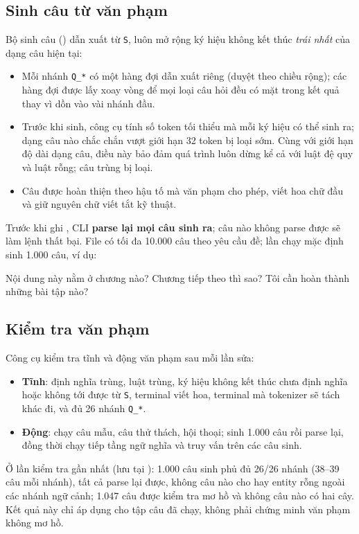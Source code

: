 \subsection{Sinh câu từ văn phạm}

Bộ sinh câu () dẫn xuất từ \texttt{S}, luôn mở rộng ký hiệu không kết
thúc \emph{trái nhất} của dạng câu hiện tại:
\begin{itemize}
  \item Mỗi nhánh \texttt{Q\_*} có một hàng đợi dẫn xuất riêng (duyệt theo chiều rộng);
        các hàng đợi được lấy xoay vòng để mọi loại câu hỏi đều có mặt trong kết quả
        thay vì dồn vào vài nhánh đầu.
  \item Trước khi sinh, công cụ tính số token tối thiểu mà mỗi ký hiệu có thể sinh ra;
        dạng câu nào chắc chắn vượt giới hạn 32 token bị loại sớm. Cùng với giới hạn độ
        dài dạng câu, điều này bảo đảm quá trình luôn dừng kể cả với luật đệ quy và luật
        rỗng; câu trùng bị loại.
  \item Câu được hoàn thiện theo hậu tố mà văn phạm cho phép, viết hoa chữ đầu và giữ
        nguyên chữ viết tắt kỹ thuật.
\end{itemize}
Trước khi ghi , CLI \textbf{parse lại mọi câu sinh ra}; câu nào không
parse được sẽ làm lệnh thất bại. File có tối đa 10.000 câu theo yêu cầu đề; lần chạy mặc
định sinh 1.000 câu, ví dụ:
\begin{trace}
Nội dung này nằm ở chương nào?
Chương tiếp theo thì sao?
Tôi cần hoàn thành những bài tập nào?
\end{trace}

\subsection{Kiểm tra văn phạm}
\label{sec:grammarcheck}

Công cụ  kiểm tra tĩnh và động văn phạm sau mỗi lần sửa:
\begin{itemize}
  \item \textbf{Tĩnh}: định nghĩa trùng, luật trùng, ký hiệu không kết thúc chưa định
        nghĩa hoặc không tới được từ \texttt{S}, terminal viết hoa, terminal mà tokenizer
        sẽ tách khác đi, và đủ 26 nhánh \texttt{Q\_*}.
  \item \textbf{Động}: chạy câu mẫu, câu thử thách, hội thoại; sinh 1.000 câu rồi parse
        lại, đồng thời chạy tiếp tầng ngữ nghĩa và truy vấn trên các câu sinh.
\end{itemize}
Ở lần kiểm tra gần nhất (lưu tại ): 1.000 câu
sinh phủ đủ 26/26 nhánh (38--39 câu mỗi nhánh), tất cả parse lại được, không câu nào cho
 hay entity rỗng ngoài các nhánh ngữ cảnh; 1.047 câu được kiểm tra mơ hồ
và không câu nào có hai cây. Kết quả này chỉ áp dụng cho tập câu đã chạy, không phải
chứng minh văn phạm không mơ hồ.
